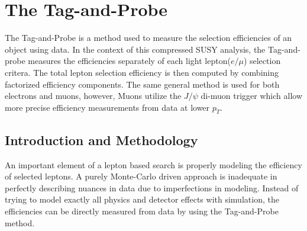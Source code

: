 \chapter{The Tag-and-Probe}

\begin{chapterabstract}
The Tag-and-Probe is a method used to measure the selection efficiencies of an object using data. In the context of this compressed SUSY analysis, the Tag-and-probe measures the efficiencies separately of each light lepton($e/\mu$) selection critera. The total lepton selection efficiency is then computed by combining factorized efficiency components. The same general method is used for both electrons and muons, however, Muons utilize  the $J/\psi$ di-muon trigger which allow more precise efficiency measurements from data at lower $p_T$.
\end{chapterabstract}

\section{Introduction and Methodology}
An important element of a lepton based search is properly modeling the efficiency of selected leptons. A purely Monte-Carlo driven approach is inadequate in perfectly describing nuances in data due to imperfections in modeling. Instead of trying to model exactly all physics and detector effects with simulation, the efficiencies can be directly measured from data by using the Tag-and-Probe method. 

